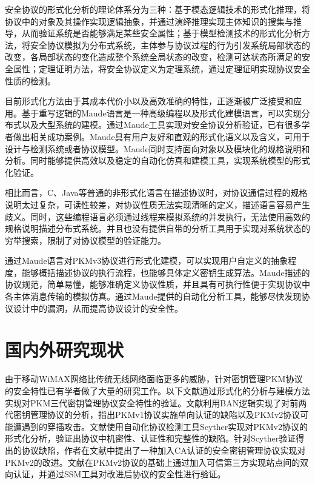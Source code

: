      安全协议的形式化分析的理论体系分为三种：基于模态逻辑技术的形式化推理，将协议中的对象及其操作实现逻辑抽象，并通过演绎推理实现主体知识的搜集与推导，从而验证系统是否能够满足某些安全属性；基于模型检测技术的形式化分析方法，将安全协议模拟为分布式系统，主体参与协议过程的行为引发系统局部状态的改变，各局部状态的变化造成整个系统全局状态的改变，检测可达状态所满足的安全属性；定理证明方法，将安全协议定义为定理系统，通过定理证明实现协议安全性质的检测\cite{鲁来凤2012 安全协议形式化分析理论与应用研究}。

目前形式化方法由于其成本代价小以及高效准确的特性，正逐渐被广泛接受和应用。基于重写逻辑的Maude\cite{Clavel2007All}语言是一种高级编程以及形式化建模语言，可以实现分布式以及大型系统的建模。通过Maude工具实现对安全协议分析验证，已有很多学者做出相关成功案例。Maude具有用户友好和直观的形式化语义以及含义，可用于设计与检测系统或者协议模型。Maude同时支持面向对象以及模块化的规格说明和分析。同时能够提供高效以及稳定的自动化仿真和建模工具，实现系统模型的形式化验证。

     相比而言，C、Java等普通的非形式化语言在描述协议时，对协议通信过程的规格说明太过复杂，可读性较差，对协议性质无法实现清晰的定义，描述语言容易产生歧义。同时，这些编程语言必须通过线程来模拟系统的并发执行，无法使用高效的规格说明描述分布式系统。并且也没有提供自带的分析工具用于实现对系统状态的穷举搜索，限制了对协议模型的验证能力。

     通过Maude语言对PKMv3协议进行形式化建模，可以实现用户自定义的抽象程度，能够概括描述协议的执行流程，也能够具体定义密钥生成算法。Maude描述的协议规范，简单易懂，能够准确定义协议性质，并且具有可执行性便于实现协议中各主体消息传输的模拟仿真。通过Maude提供的自动化分析工具，能够尽快发现协议设计中的漏洞，从而提高协议设计的安全性\cite{吴昌2008网络安全协议的高效分析系统}。


\section{国内外研究现状}

由于移动WiMAX网络比传统无线网络面临更多的威胁，针对密钥管理PKM协议的安全特性已有学者做了大量的研究工作。以下文献通过形式化的分析与建模方法实现对PKM三代密钥管理协议安全特性的验证。文献\cite{Xu2006Attacks}利用BAN逻辑实现了对前两代密钥管理协议的分析，指出PKMv1协议实施单向认证的缺陷以及PKMv2协议可能遭遇到的穿插攻击。文献\cite{Kahya2012Formal}使用自动化协议检测工具Scyther实现对PKMv2协议的形式化分析，验证出协议中机密性、认证性和完整性的缺陷。针对Scyther验证得出的协议缺陷，作者在文献\cite{Kahya2012Secure}中提出了一种加入CA认证的安全密钥管理协议实现对PKMv2的改进。文献\cite{You2010Verification}在PKMv2协议的基础上通过加入可信第三方实现站点间的双向认证，并通过SSM工具对改进后协议的安全性进行验证。

